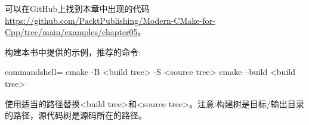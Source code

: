 可以在GitHub上找到本章中出现的代码 \url{https://github.com/PacktPublishing/Modern-CMake-for-Cpp/tree/main/examples/chapter05}。

构建本书中提供的示例，推荐的命令:

\begin{tcblisting}{commandshell={}}
cmake -B <build tree> -S <source tree>
cmake --build <build tree>
\end{tcblisting}

使用适当的路径替换<build tree>和<source tree>。注意:构建树是目标/输出目录的路径，源代码树是源码所在的路径。